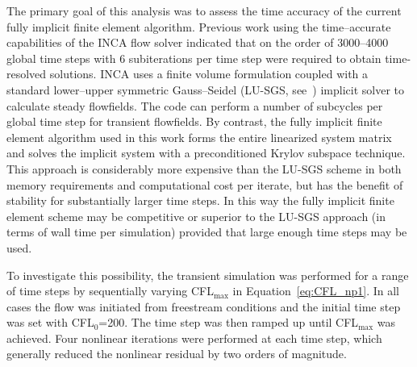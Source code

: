 The primary goal of this analysis was to assess the time accuracy of the current fully implicit finite element algorithm.  Previous work using the time--accurate capabilities of the INCA flow solver indicated that on the order of 3000--4000 global time steps with 6 subiterations per time step were required to obtain time-resolved solutions.  INCA uses a finite volume formulation coupled with a standard lower--upper symmetric Gauss--Seidel (LU-SGS, see~\cite{yoon_jameson_LU-SGS_87,yoon_jameson_LU-SGS_88}) implicit solver to calculate steady flowfields. The code can perform a number of subcycles per global time step for transient flowfields.  By contrast, the fully implicit finite element algorithm used in this work forms the entire linearized system matrix and solves the implicit system with a preconditioned Krylov subspace technique.  This approach is considerably more expensive than the LU-SGS scheme in both memory requirements and computational cost per iterate, but has the benefit of stability for substantially larger time steps.  In this way the fully implicit finite element scheme may be competitive or superior to the LU-SGS approach (in terms of wall time per simulation) provided that large enough time steps may be used.

To investigate this possibility, the transient simulation was performed for a range of time steps by sequentially varying CFL$_{\max}$ in Equation~\eqref{eq:CFL_np1}.  In all cases the flow was initiated from freestream conditions and the initial time step was set with CFL$_0$=200.  The time step was then ramped up until CFL$_{\max}$ was achieved.  Four nonlinear iterations were performed at each time step, which generally reduced the nonlinear residual by two orders of magnitude.  

